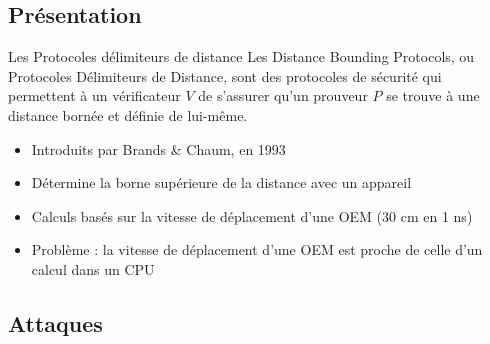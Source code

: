 \documentclass[aspectratio=169]{beamer}
\begin{document}
\subsection{Présentation}

\begin{frame}{Les Protocoles délimiteurs de distance}
Les Distance Bounding Protocols, ou Protocoles Délimiteurs de Distance, sont des protocoles de sécurité qui permettent à un vérificateur $V$ de s'assurer qu'un prouveur $P$ se trouve à une distance bornée et définie de lui-même. \cite{wiki:pdd}

\bigskip

\pause
\begin{itemize}
\item Introduits par Brands \& Chaum, en 1993 \cite{DB1}
\item Détermine la borne supérieure de la distance avec un appareil
\item Calculs basés sur la vitesse de déplacement d'une OEM (30 cm en 1 ns)
\pause
\item Problème : la vitesse de déplacement d'une OEM est proche de celle d'un calcul dans un CPU 
\end{itemize}

\end{frame}

\subsection{Attaques}
\end{document}
